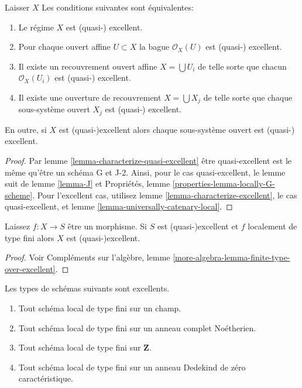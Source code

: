 \begin{lemma}

\label{lemma-locally-excellent}

Laisser $X$ Les conditions suivantes sont équivalentes:

\begin{enumerate}

\item Le régime $X$ est (quasi-) excellent.
\item Pour chaque ouvert affine $U \subset X$ la bague $\mathcal{O}_X(U)$
est (quasi-) excellent.
\item Il existe un recouvrement ouvert affine $X = \bigcup U_i$ de telle sorte que chacun $\mathcal{O}_X(U_i)$ est (quasi-) excellent.
\item Il existe une ouverture de recouvrement $X = \bigcup X_j$
de telle sorte que chaque sous-système ouvert $X_j$ est (quasi-) excellent.

\end{enumerate}

En outre, si $X$ est (quasi-)excellent alors chaque sous-système ouvert est (quasi-) excellent.

\end{lemma}

\begin{proof}
Par lemme \ref{lemma-characterize-quasi-excellent} être quasi-excellent est le même qu'être un schéma G et J-2. Ainsi, pour le cas quasi-excellent, le lemme suit de lemme \ref{lemma-J} et Propriétés, lemme \ref{properties-lemma-locally-G-scheme}. Pour l'excellent cas, utilisez lemme \ref{lemma-characterize-excellent}, le cas quasi-excellent, et lemme \ref{lemma-universally-catenary-local}.
\end{proof}

\begin{lemma}

\label{lemma-finite-type-excellent}
Laissez $f : X \to S$ être un morphisme. Si $S$ est (quasi-)excellent et $f$ localement de type fini alors $X$ est (quasi-)excellent.
\end{lemma}

\begin{proof}
Voir Compléments sur l'algèbre, lemme \ref{more-algebra-lemma-finite-type-over-excellent}.
\end{proof}

\begin{lemma}

\label{lemma-ubiquity-excellent}
Les types de schémas suivants sont excellents.
\begin{enumerate}
\item Tout schéma local de type fini sur un champ.
\item Tout schéma local de type fini sur un anneau complet Noétherien.
\item Tout schéma local de type fini sur $\mathbf{Z}$.
\item Tout schéma local de type fini sur un anneau Dedekind de zéro caractéristique.
\end{enumerate}

\end{lemma}

